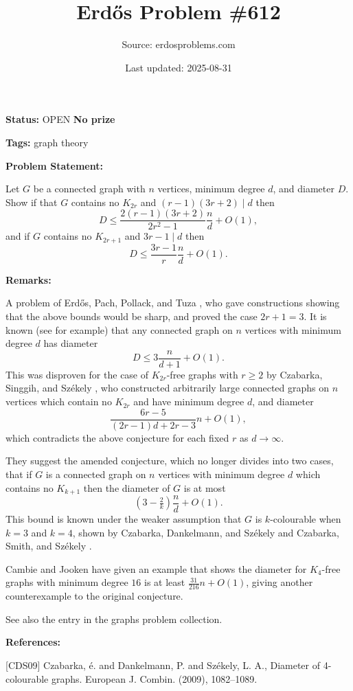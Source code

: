 \documentclass{article}
\title{Erd\H{o}s Problem \#612}
\date{Last updated: 2025-08-31}
\author{Source: erdosproblems.com}
\begin{document}
\maketitle

\noindent\textbf{Status:} OPEN \quad \textbf{No prize}

\noindent\textbf{Tags:} graph theory

\medskip
\noindent\textbf{Problem Statement:}

Let $G$ be a connected graph with $n$ vertices, minimum degree $d$, and diameter $D$. Show if that $G$ contains no $K_{2r}$ and $(r-1)(3r+2)\mid d$ then\[D\leq \frac{2(r-1)(3r+2)}{2r^2-1}\frac{n}{d}+O(1),\]and if $G$ contains no $K_{2r+1}$ and $3r-1 \mid d$ then\[D\leq \frac{3r-1}{r}\frac{n}{d}+O(1).\]

\bigskip
\noindent\textbf{Remarks:}

A problem of Erd\H{o}s, Pach, Pollack, and Tuza \cite{EPPT89}, who gave constructions showing that the above bounds would be sharp, and proved the case $2r+1=3$. It is known (see \cite{EPPT89} for example) that any connected graph on $n$ vertices with minimum degree $d$ has diameter\[D\leq 3\frac{n}{d+1}+O(1).\]This was disproven for the case of $K_{2r}$-free graphs with $r\geq 2$ by Czabarka, Singgih, and Sz\'{e}kely \cite{CSS21}, who constructed arbitrarily large connected graphs on $n$ vertices which contain no $K_{2r}$ and have minimum degree $d$, and diameter\[\frac{6r-5}{(2r-1)d+2r-3}n+O(1),\]which contradicts the above conjecture for each fixed $r$ as $d\to \infty$.

They suggest the amended conjecture, which no longer divides into two cases, that if $G$ is a connected graph on $n$ vertices with minimum degree $d$ which contains no $K_{k+1}$ then the diameter of $G$ is at most\[(3-\tfrac{2}{k})\frac{n}{d}+O(1).\]This bound is known under the weaker assumption that $G$ is $k$-colourable when $k=3$ and $k=4$, shown by Czabarka, Dankelmann, and Sz\'{e}kely \cite{CDS09} and Czabarka, Smith, and Sz\'{e}kely \cite{CSS23}.

Cambie and Jooken \cite{CaJo25} have given an example that shows the diameter for $K_4$-free graphs with minimum degree $16$ is at least $\frac{31}{216}n+O(1)$, giving another counterexample to the original conjecture.

See also the entry in the graphs problem collection.

\bigskip
\noindent\textbf{References:}

[CDS09] Czabarka, \'{e}. and Dankelmann, P. and Sz\'{e}kely, L. A., Diameter of 4-colourable graphs. European J. Combin. (2009), 1082--1089.
 
\end{document}
